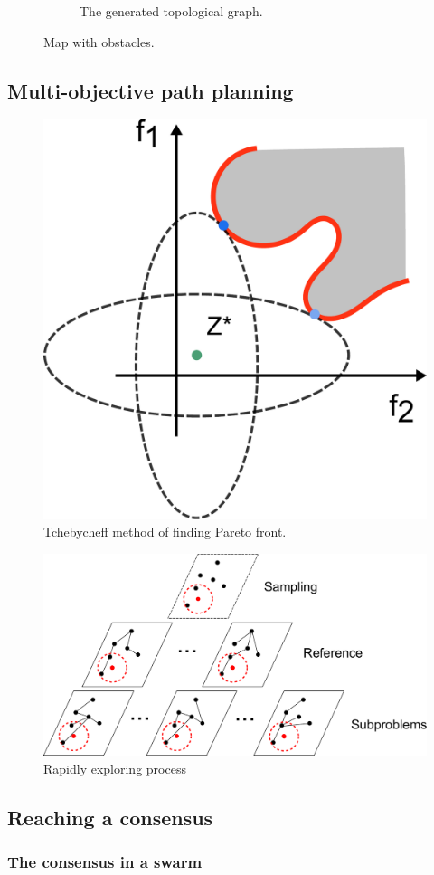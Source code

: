 \documentclass[phd]{byuprop}
\begin{document}
\begin{figure}[htbp]
\begin{subfigure}[t]{0.35\linewidth}
		\caption{The generated topological graph.}
		\label{fig:obs_map:topology}
	\end{subfigure}   
	\caption{Map with obstacles.}
	\label{fig:obs_map}
\end{figure}

\subsection{Multi-objective path planning}

\begin{figure}
\centering
\includegraphics[width=0.5\linewidth]{fig/Tchebycheff}
\caption{Tchebycheff method of finding Pareto front.}
\label{fig:Tchebycheff}
\end{figure}

\begin{figure}
	\centering
	\includegraphics[width=0.8\linewidth]{./fig/MORRTstar}
	\caption{Rapidly exploring process}
	\label{fig:MORRTstar}
\end{figure}

\subsection{Reaching a consensus}

\subsubsection{The consensus in a swarm}
\end{document}
